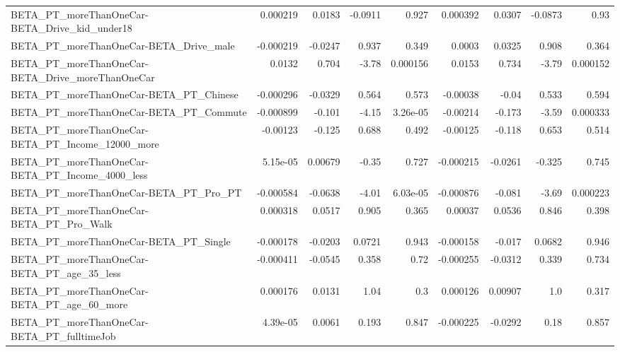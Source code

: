\begin{tabular}{lrrrrrrrr}
BETA\_PT\_moreThanOneCar-BETA\_Drive\_kid\_under18      &    0.000219 &       0.0183 &   -0.0911 &    0.927 &   0.000392 &      0.0307 &      -0.0873 &          0.93 \\
BETA\_PT\_moreThanOneCar-BETA\_Drive\_male             &   -0.000219 &      -0.0247 &     0.937 &    0.349 &     0.0003 &      0.0325 &        0.908 &         0.364 \\
BETA\_PT\_moreThanOneCar-BETA\_Drive\_moreThanOneCar   &      0.0132 &        0.704 &     -3.78 & 0.000156 &     0.0153 &       0.734 &        -3.79 &      0.000152 \\
BETA\_PT\_moreThanOneCar-BETA\_PT\_Chinese             &   -0.000296 &      -0.0329 &     0.564 &    0.573 &   -0.00038 &       -0.04 &        0.533 &         0.594 \\
BETA\_PT\_moreThanOneCar-BETA\_PT\_Commute             &   -0.000899 &       -0.101 &     -4.15 & 3.26e-05 &   -0.00214 &      -0.173 &        -3.59 &      0.000333 \\
BETA\_PT\_moreThanOneCar-BETA\_PT\_Income\_12000\_more   &    -0.00123 &       -0.125 &     0.688 &    0.492 &   -0.00125 &      -0.118 &        0.653 &         0.514 \\
BETA\_PT\_moreThanOneCar-BETA\_PT\_Income\_4000\_less    &    5.15e-05 &      0.00679 &     -0.35 &    0.727 &  -0.000215 &     -0.0261 &       -0.325 &         0.745 \\
BETA\_PT\_moreThanOneCar-BETA\_PT\_Pro\_PT              &   -0.000584 &      -0.0638 &     -4.01 & 6.03e-05 &  -0.000876 &      -0.081 &        -3.69 &      0.000223 \\
BETA\_PT\_moreThanOneCar-BETA\_PT\_Pro\_Walk            &    0.000318 &       0.0517 &     0.905 &    0.365 &    0.00037 &      0.0536 &        0.846 &         0.398 \\
BETA\_PT\_moreThanOneCar-BETA\_PT\_Single              &   -0.000178 &      -0.0203 &    0.0721 &    0.943 &  -0.000158 &      -0.017 &       0.0682 &         0.946 \\
BETA\_PT\_moreThanOneCar-BETA\_PT\_age\_35\_less         &   -0.000411 &      -0.0545 &     0.358 &     0.72 &  -0.000255 &     -0.0312 &        0.339 &         0.734 \\
BETA\_PT\_moreThanOneCar-BETA\_PT\_age\_60\_more         &    0.000176 &       0.0131 &      1.04 &      0.3 &   0.000126 &     0.00907 &          1.0 &         0.317 \\
BETA\_PT\_moreThanOneCar-BETA\_PT\_fulltimeJob         &    4.39e-05 &       0.0061 &     0.193 &    0.847 &  -0.000225 &     -0.0292 &         0.18 &         0.857 \\

\end{tabular}
